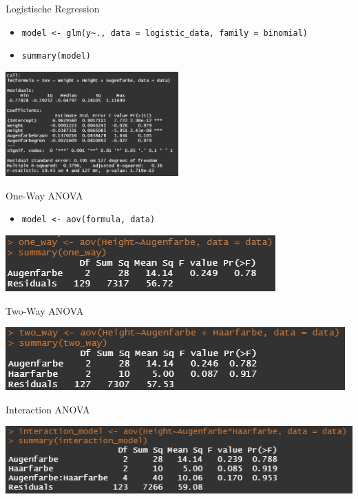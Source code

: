 \documentclass[aspectratio = 169]{chariteBeamer}
\begin{document}
\begin{frame}[fragile]{Logistische Regression}
	\begin{itemize}
		\item \verb+model <- glm(y~., data = logistic_data, family = binomial)+
		\item \verb+summary(model)+
	\end{itemize}
			
	\begin{center}
		\includegraphics[height=4cm]{LogisticRegressionSummary}
	\end{center}
\end{frame}

\begin{frame}[fragile]{One-Way ANOVA}
	\begin{itemize}
		\item \verb+model <- aov(formula, data)+
	\end{itemize}	
	\begin{center}
		\includegraphics{OneWay}
	\end{center}
\end{frame}

\begin{frame}[fragile]{Two-Way ANOVA}
	\begin{center}
		\includegraphics{TwoWay}
	\end{center}
\end{frame}

\begin{frame}[fragile]{Interaction ANOVA}
	\begin{center}
		\includegraphics{Interaction}
	\end{center}
\end{frame}
\end{document}
